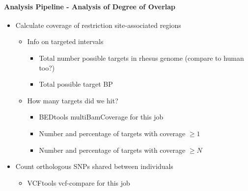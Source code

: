 \documentclass[12pt]{article}
\begin{document}
\paragraph{Analysis Pipeline - Analysis of Degree of Overlap}
\begin{itemize}
	\item Calculate coverage of restriction site-associated regions
	\begin{itemize}
		\item Info on targeted intervals
		\begin{itemize}
			\item Total number possible targets in rhesus genome (compare to human too?)
			\item Total possible target BP
		\end{itemize}
		\item How many targets did we hit?
		\begin{itemize}
			\item BEDtools multiBamCoverage for this job
			\item Number and percentage of targets with coverage $\ge 1$
			\item Number and percentage of targets with coverage $\ge N$
		\end{itemize}
	\end{itemize}
	\item Count orthologous SNPs shared between individuals
	\begin{itemize}
		\item VCFtools vcf-compare for this job
	\end{itemize}
\end{itemize}

\end{document}
